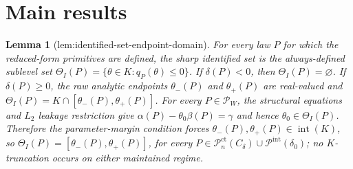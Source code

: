 \documentclass{article}
\newtheorem{lemma}{Lemma}
\begin{document}
\section{Main results}

\begin{lemma}[lem:identified-set-endpoint-domain]\label{lem:identified-set-endpoint-domain}
For every law \(P\) for which the reduced-form primitives are defined, the sharp identified set is the always-defined sublevel set \(\Theta_I(P)=\{\theta\in K:q_P(\theta)\leq0\}\). If \(\delta(P)<0\), then \(\Theta_I(P)=\varnothing\). If \(\delta(P)\geq0\), the raw analytic endpoints \(\theta_-(P)\) and \(\theta_+(P)\) are real-valued and \(\Theta_I(P)=K\cap[\theta_-(P),\theta_+(P)]\). For every \(P\in\mathcal P_W\), the structural equations and \(L_2\) leakage restriction give \(\alpha(P)-\theta_0\beta(P)=\gamma\) and hence \(\theta_0\in\Theta_I(P)\). Therefore the parameter-margin condition forces \(\theta_-(P),\theta_+(P)\in\operatorname{int}(K)\), so \(\Theta_I(P)=[\theta_-(P),\theta_+(P)]\), for every \(P\in\mathcal P_n^{\mathrm{ct}}(C_{\delta})\cup\mathcal P^{\mathrm{int}}(\delta_0)\); no \(K\)-truncation occurs on either maintained regime.
\end{lemma}
\end{document}
